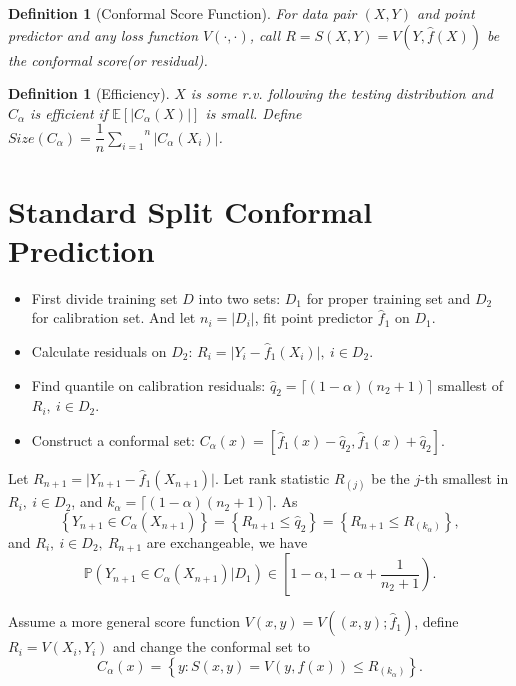 \documentclass[12pt, a4paper, oneside]{article}
\newtheorem{definition}[theorem]{Definition}
\begin{document}
    \begin{definition}[Conformal Score Function]
        For data pair $(X,Y)$ and point predictor and any loss function $V(\cdot,\cdot)$, call $R=S(X,Y)=V(Y,\hat{f}(X))$ be the conformal score(or residual).
    \end{definition}


    \begin{definition}[Efficiency]
        $X$ is some r.v. following the testing distribution and $C_\alpha$ is efficient if $\mathbb{E}\left[ |C_\alpha(X)| \right]$ is small. Define $Size(C_\alpha)=\dfrac{1}{n}\overset{n}{\underset{i=1}\sum}|C_\alpha(X_i)|$.
    \end{definition}


\section{Standard Split Conformal Prediction}
    \begin{itemize}
        \item First divide training set $D$ into two sets: $D_1$ for proper training set and $D_2$ for calibration set. And let $n_i=|D_i|$, fit point predictor $\hat{f}_1$ on $D_1$.
        \item Calculate residuals on $D_2$: $R_i=\Big|Y_i-\hat{f}_1(X_i)\Big|,\ i\in D_2$.
        \item Find quantile on calibration residuals: $\hat{q}_2=\lceil (1-\alpha)(n_2+1)\rceil$ smallest of $R_i,\ i\in D_2$.
        \item Construct a conformal set: $C_\alpha(x)=\left[ \hat{f}_1(x)-\hat{q}_2,\hat{f}_1(x)+\hat{q}_2 \right]$.
    \end{itemize}


    Let $R_{n+1}=\Big|Y_{n+1}-\hat{f}_1(X_{n+1})\Big|$. Let rank statistic $R_{(j)}$ be the $j$-th smallest in $R_i,\ i\in D_2$, and $k_\alpha=\lceil (1-\alpha)(n_2+1)\rceil$. As
    \begin{equation*}
        \left\{ Y_{n+1}\in C_\alpha(X_{n+1}) \right\}=\left\{ R_{n+1}\leq\hat{q}_2 \right\}=\left\{ R_{n+1}\leq R_{(k_\alpha)} \right\},
    \end{equation*}
    and $R_i,\ i\in D_2,\ R_{n+1}$ are exchangeable, we have
    \begin{equation*}
        \mathbb{P}\left( Y_{n+1}\in C_\alpha(X_{n+1})\Big|D_1 \right)\in\left[ 1-\alpha,1-\alpha+\dfrac{1}{n_2+1} \right).
    \end{equation*}


    Assume a more general score function $V(x,y)=V((x,y);\hat{f}_1)$, define $R_i=V(X_i,Y_i)$ and change the conformal set to
    \begin{equation*}
        C_\alpha(x)=\left\{ y:S(x,y)=V(y,f(x))\leq R_{(k_\alpha)} \right\}.
    \end{equation*}
\end{document}
